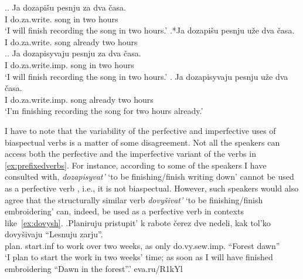 \ex.\label{ex:3pref}\ag. \label{ex:3preftel}Ja dozapi\v{s}u pesnju za dva \v{c}asa.\\
I do.za.write. song in two hours\\
\trans `I will finish recording the song in two hours.'
\bg.*Ja dozapi\v{s}u pesnju u\v{z}e dva \v{c}asa.\label{ex:3prefatel}\\
I do.za.write. song already two hours\\

\ex.\label{ex:2pref}\ag. \label{ex:2preftel}Ja dozapisyvaju pesnju za dva \v{c}asa.\\
I do.za.write.imp. song in two hours\\
\trans `I will finish recording the song in two hours.'
\bg. \label{ex:2prefatel}Ja dozapisyvaju pesnju u\v{z}e dva \v{c}asa.\\
I do.za.write.imp. song already two hours\\
\trans `I'm finishing recording the song for two hours already.'

I have to note that the variability of  the perfective and imperfective uses of biaspectual verbs  is a matter of some disagreement. Not all the speakers can access both the perfective and the imperfective variant of the verbs in \ref{ex:prefixedverbs}. For instance, according to some of the speakers I have consulted with, \textit{dozapisyvat'} `to be finishing/finish writing down' cannot be used as a perfective verb , i.e., it is not biaspectual. However, such speakers would also agree that the structurally similar verb \textit{dovy\v{s}ivat'} `to be finishing/finish embroidering' can, indeed, be used as a perfective verb  in contexts   like~\ref{ex:dovysh}.
\exg.\label{ex:dovysh}Planiruju pristupit' k rabote \v{c}erez dve nedeli, kak tol'ko dovy\v{s}ivaju ``Lesnuju zarju''.\\
plan. start.inf to work over two weeks, as only do.vy.sew.imp. ``Forest dawn''\\
\trans `I plan to start the work in two weeks' time; as soon as I will have finished embroidering ``Dawn in the forest''.'
\hfill eva.ru/R1kYl

